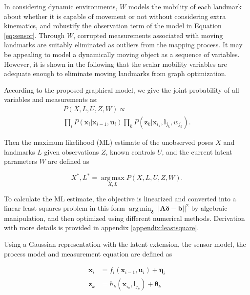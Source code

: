 In considering dynamic environments, $W$ models the mobility of each landmark about whether it is capable of movement or not without considering extra kinematics, and robustify the observation term of the model in Equation \ref{eq:sensor}.  Through $W$, corrupted measurements associated with moving landmarks are suitably eliminated as outliers from the mapping process. It may be appealing to model a dynamically moving object as a sequence of variables. However, it is shown in the following that the scalar mobility variables are adequate enough to eliminate moving landmarks from graph optimization.

According to the proposed graphical model, we give the joint probability of all variables and measurements as:
\begin{multline}
P(X, L, U, Z, W) \propto  \\
\prod\limits_{i}P(\boldsymbol{x}_i|\boldsymbol{x}_{i-1}, \boldsymbol{u}_i)\prod\limits_{k}P(\boldsymbol{z}_k|\boldsymbol{x}_{i_k}, \boldsymbol{l}_{j_k}, w_{j_k}).
\label{eq:jointProb}
\end{multline}

Then the maximum likelihood (ML) estimate of the unobserved poses $X$ and landmarks $L$ given observations $Z$, known controls $U$, and the current latent parameters $W$ are defined as

\begin{equation}
X^*, L^* = \operatorname*{arg\,max}_{X,L} P(X,L,U,Z,W).
\end{equation}

To calculate the ML estimate, the objective is linearized and converted into a linear least
squares problem in this form $\operatorname*{arg\,min}_{\boldsymbol{\delta}} || \boldsymbol{A}
\boldsymbol{\delta}  - \boldsymbol{b} ||^2$ by algebraic manipulation, and then optimized using
different numerical methods. Derivation with more details is provided in appendix \ref{appendix:leastsquare}.

Using a Gaussian representation with the latent extension, the sensor
model, the process model and measurement equation are defined as

\begin{equation}
\begin{aligned}
\boldsymbol{x}_i &= f_i(\boldsymbol{x}_{i-1}, \boldsymbol{u}_i) + \boldsymbol{\eta}_i \\
\boldsymbol{z}_k &= h_k(\boldsymbol{x}_{i_k}, \boldsymbol{l}_{j_k}) + \boldsymbol{\theta}_k
\end{aligned}
\label{eq:gaussRepresentation}
\end{equation}

